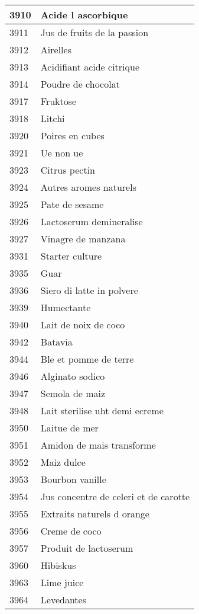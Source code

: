 \begin{longtable}{|l|l|}
3910 & Acide l ascorbique \\ \hline 
3911 & Jus de fruits de la passion \\ \hline 
3912 & Airelles \\ \hline 
3913 & Acidifiant acide citrique \\ \hline 
3914 & Poudre de chocolat \\ \hline 
3917 & Fruktose \\ \hline 
3918 & Litchi \\ \hline 
3920 & Poires en cubes \\ \hline 
3921 & Ue non ue \\ \hline 
3923 & Citrus pectin \\ \hline 
3924 & Autres aromes naturels \\ \hline 
3925 & Pate de sesame \\ \hline 
3926 & Lactoserum demineralise \\ \hline 
3927 & Vinagre de manzana \\ \hline 
3931 & Starter culture \\ \hline 
3935 & Guar \\ \hline 
3936 & Siero di latte in polvere \\ \hline 
3939 & Humectante \\ \hline 
3940 & Lait de noix de coco \\ \hline 
3942 & Batavia \\ \hline 
3944 & Ble et pomme de terre \\ \hline 
3946 & Alginato sodico \\ \hline 
3947 & Semola de maiz \\ \hline 
3948 & Lait sterilise uht demi ecreme \\ \hline 
3950 & Laitue de mer \\ \hline 
3951 & Amidon de mais transforme \\ \hline 
3952 & Maiz dulce \\ \hline 
3953 & Bourbon vanille \\ \hline 
3954 & Jus concentre de celeri et de carotte \\ \hline 
3955 & Extraits naturels d orange \\ \hline 
3956 & Creme de coco \\ \hline 
3957 & Produit de lactoserum \\ \hline 
3960 & Hibiskus \\ \hline 
3963 & Lime juice \\ \hline 
3964 & Levedantes \\ \hline 

\end{longtable}
